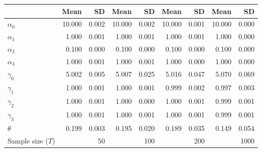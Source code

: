 
\begin{tabular}[t]{lrrrrrrrr}
\toprule
  & Mean & SD & Mean  & SD  & Mean   & SD   & Mean    & SD   \\
\midrule
$\alpha_{0}$ & 10.000 & 0.002 & 10.000 & 0.002 & 10.000 & 0.001 & 10.000 & 0.000\\
$\alpha_{1}$ & 1.000 & 0.001 & 1.000 & 0.001 & 1.000 & 0.001 & 1.000 & 0.000\\
$\alpha_{2}$ & 0.100 & 0.000 & 0.100 & 0.000 & 0.100 & 0.000 & 0.100 & 0.000\\
$\alpha_{3}$ & 1.000 & 0.001 & 1.000 & 0.001 & 1.000 & 0.000 & 1.000 & 0.000\\
$\gamma_{0}$ & 5.002 & 0.005 & 5.007 & 0.025 & 5.016 & 0.047 & 5.070 & 0.069\\
$\gamma_{1}$ & 1.000 & 0.001 & 1.000 & 0.001 & 0.999 & 0.002 & 0.997 & 0.003\\
$\gamma_{2}$ & 1.000 & 0.001 & 1.000 & 0.000 & 1.000 & 0.001 & 0.999 & 0.001\\
$\gamma_{3}$ & 1.000 & 0.001 & 1.000 & 0.001 & 1.000 & 0.001 & 0.999 & 0.001\\
$\theta$ & 0.199 & 0.003 & 0.195 & 0.020 & 0.189 & 0.035 & 0.149 & 0.054\\
Sample size ($T$) &  & 50 &  & 100 &  & 200 &  & 1000\\
\bottomrule
\end{tabular}
